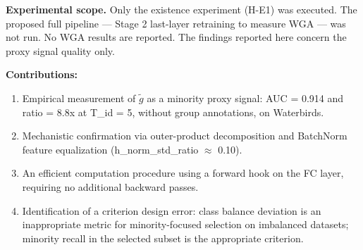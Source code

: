 \textbf{Experimental scope.} Only the existence experiment (H-E1) was executed. The proposed full pipeline --- Stage 2 last-layer retraining to measure WGA --- was not run. No WGA results are reported. The findings reported here concern the proxy signal quality only.

\textbf{Contributions:}

\begin{enumerate}
\item Empirical measurement of $\tilde{g}$ as a minority proxy signal: AUC = 0.914 and ratio = 8.8x at T\_id = 5, without group annotations, on Waterbirds.
\item Mechanistic confirmation via outer-product decomposition and BatchNorm feature equalization (h\_norm\_std\_ratio $\approx$ 0.10).
\item An efficient computation procedure using a forward hook on the FC layer, requiring no additional backward passes.
\item Identification of a criterion design error: class balance deviation is an inappropriate metric for minority-focused selection on imbalanced datasets; minority recall in the selected subset is the appropriate criterion.
\end{enumerate}

